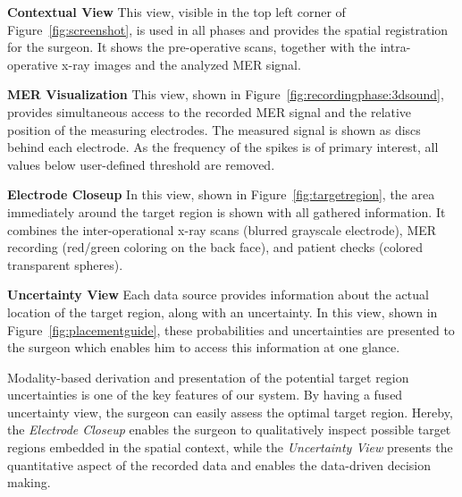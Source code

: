 \documentclass{egpubl}
\begin{document}
\noindent \textbf{Contextual View} This view, visible in the top left corner of Figure~\ref{fig:screenshot}, is used in all phases and provides the spatial registration for the surgeon. It shows the pre-operative scans, together with the intra-operative x-ray images and the analyzed MER signal.

\noindent \textbf{MER Visualization} This view, shown in Figure~\ref{fig:recordingphase:3dsound}, provides simultaneous access to the recorded MER signal and the relative position of the measuring electrodes. The measured signal is shown as discs behind each electrode. As the frequency of the spikes is of primary interest, all values below user-defined threshold are removed.

\noindent \textbf{Electrode Closeup} In this view, shown in Figure~\ref{fig:targetregion}, the area immediately around the target region is shown with all gathered information. It combines the inter-operational x-ray scans (blurred grayscale electrode), MER recording (red/green coloring on the back face), and patient checks (colored transparent spheres).

\noindent \textbf{Uncertainty View} Each data source provides information about the actual location of the target region, along with an uncertainty. In this view, shown in Figure~\ref{fig:placementguide}, these probabilities and uncertainties are presented to the surgeon which enables him to access this information at one glance.

Modality-based derivation and presentation of the potential target region uncertainties is one of the key features of our system. By having a fused uncertainty view, the surgeon can easily assess the optimal target region. Hereby, the \emph{Electrode Closeup} enables the surgeon to qualitatively inspect possible target regions embedded in the spatial context, while the \emph{Uncertainty View} presents the quantitative aspect of the recorded data and enables the data-driven decision making.
\end{document}
